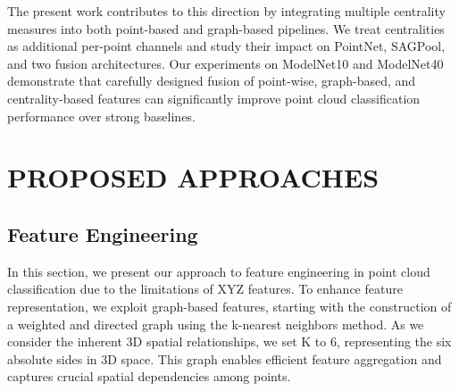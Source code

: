 \documentclass[conference]{IEEEtran}
\begin{document}
The present work contributes to this direction by integrating multiple
centrality measures into both point-based and graph-based pipelines. We treat
centralities as additional per-point channels and study their impact on
PointNet, SAGPool, and two fusion architectures. Our experiments on ModelNet10
and ModelNet40 demonstrate that carefully designed fusion of point-wise,
graph-based, and centrality-based features can significantly improve point
cloud classification performance over strong baselines.


\section{PROPOSED APPROACHES}
\subsection{Feature Engineering }\label{AA}
In this section, we present our approach to feature engineering in point cloud classification due to the limitations of XYZ features.
 To enhance feature representation, we exploit graph-based features, starting with the construction of a weighted and directed graph
  using the k-nearest neighbors method. As we consider the inherent 3D spatial relationships, we set K to 6, representing the six absolute
   sides in 3D space. This graph enables efficient feature aggregation and captures crucial spatial dependencies among points.
\end{document}
